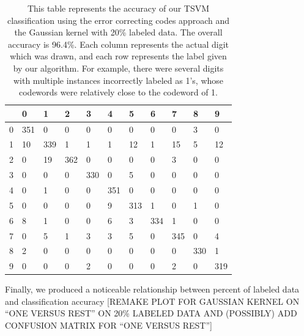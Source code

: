 \documentclass[11pt]{article}
\begin{document}
\begin{table}[]
  \centering
  \caption{This table represents the accuracy of our TSVM classification using
  the error correcting codes approach and the Gaussian kernel
 with 20\% labeled data. The overall accuracy is 96.4\%. Each column represents the actual digit which was drawn, and each row represents the label given by our algorithm. For example, there were several digits with multiple instances
  incorrectly labeled as 1's, whose codewords were relatively close to the
  codeword of 1.}
  \label{my-table}
  \vspace{.3in}
  \begin{tabular}{l|llllllllll}
    & 0 & 1 & 2 & 3 & 4 & 5 & 6 & 7 & 8 & 9\\\hline
    0 &351 & 0   & 0   & 0   & 0   & 0   & 0   & 0   & 3   & 0   \\
    1 &10   & 339 & 1  & 1   & 1   & 12   & 1   & 15  & 5   & 12  \\
    2 & 0   & 19  & 362 & 0   & 0   & 0   & 0   & 3   & 0   & 0   \\
    3 & 0   & 0   & 0   & 330 & 0   & 5  & 0   & 0   & 0   & 0   \\
    4 & 0   & 1   & 0   & 0   & 351 & 0   & 0   & 0  & 0   & 0   \\
    5 & 0   & 0  & 0   & 0   & 9  & 313 & 1   & 0   & 1  & 0  \\
    6 & 8   & 1   & 0   & 0   & 6   & 3   & 334 & 1   & 0   & 0   \\
    7 & 0   & 5   & 1   & 3   & 3   & 5   & 0   & 345 & 0   & 4   \\
    8 & 2  & 0   & 0   & 0   & 0   & 0   & 0   & 0   & 330 & 1   \\
    9 & 0   & 0   & 0   & 2   & 0  & 0  & 0   & 2   & 0   & 319
  \end{tabular}
  \end{table}

Finally, we produced a noticeable relationship between percent of labeled data and classification accuracy [REMAKE PLOT FOR GAUSSIAN KERNEL ON
``ONE VERSUS REST'' ON 20\% LABELED DATA AND (POSSIBLY) ADD CONFUSION MATRIX
FOR ``ONE VERSUS REST''] \par
\end{document}
